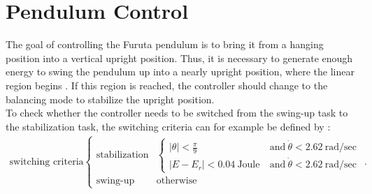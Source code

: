 \section{Pendulum Control}
The goal of controlling the Furuta pendulum is to bring it from a hanging 
position into a vertical upright position. Thus, it is necessary to 
generate enough energy to swing the pendulum up into a nearly upright position, 
where the linear region begins \citep{kurode2011swing}. If this region is 
reached, the controller should change to the balancing mode to stabilize the 
upright position.\\
To check whether the controller needs to be switched from the swing-up task to 
the stabilization task, the switching criteria can for 
example be defined by \citep{hamza2019current}:
\begin{align*}
\text{switching criteria}
\begin{cases} \text{stabilization} &\begin{cases}
|\theta|< \frac{\pi}{9} \ &\text{and}\  \dot{\theta} < 2.62\  \text{rad/sec}\\
|E-E_r|< 0.04 \ \text{Joule}\ &\text{and}\  \dot{\theta} < 2.62\  \text{rad/sec}
\end{cases}\\
\text{swing-up} & \text{otherwise}
\end{cases}.
\end{align*}
